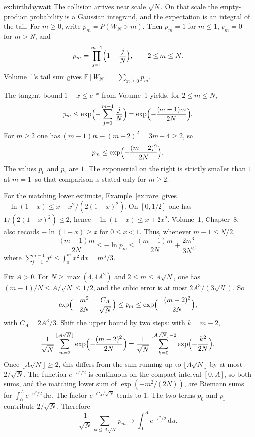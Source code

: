 \begin{solution}{ex:birthdaywait}
\idea The collision arrives near scale $\sqrt N$. On that scale the empty-product probability is a Gaussian integrand, and the expectation is an integral of the tail.
\writeup For $m\ge0$, write $p_m=P(W_N>m)$. Then $p_m=1$ for $m\le1$, $p_m=0$ for $m>N$, and
\[
 p_m=\prod_{j=1}^{m-1}\Bigl(1-\frac jN\Bigr),\qquad 2\le m\le N.
\]
Volume~1's tail sum gives $\mathbb E[W_N]=\sum_{m\ge0}p_m$.

The tangent bound $1-x\le e^{-x}$ from Volume~1 yields, for $2\le m\le N$,
\[
 p_m\le\exp\Bigl(-\sum_{j=1}^{m-1}\frac jN\Bigr)
 =\exp\Bigl(-\frac{(m-1)m}{2N}\Bigr).
\]
For $m\ge2$ one has $(m-1)m-(m-2)^2=3m-4\ge2$, so
\[
 p_m\le\exp\Bigl(-\frac{(m-2)^2}{2N}\Bigr).
\]
The values $p_0$ and $p_1$ are $1$. The exponential on the right is strictly smaller than $1$ at $m=1$, so that comparison is stated only for $m\ge2$.

For the matching lower estimate, Example~\ref{ex:rare} gives $-\ln(1-x)\le x+x^2/(2(1-x)^2)$. On $[0,1/2]$ one has $1/(2(1-x)^2)\le2$, hence $-\ln(1-x)\le x+2x^2$. Volume~1, Chapter~8, also records $-\ln(1-x)\ge x$ for $0\le x<1$. Thus, whenever $m-1\le N/2$,
\[
 \frac{(m-1)m}{2N}
 \le-\ln p_m
 \le\frac{(m-1)m}{2N}+\frac{2m^3}{3N^2},
\]
where $\sum_{j=1}^{m-1}j^2\le\int_0^m x^2\,\mathrm dx=m^3/3$.

Fix $A>0$. For $N\ge\max(4,4A^2)$ and $2\le m\le A\sqrt N$, one has $(m-1)/N\le A/\sqrt N\le1/2$, and the cubic error is at most $2A^3/(3\sqrt N)$. So
\[
 \exp\Bigl(-\frac{m^2}{2N}-\frac{C_A}{\sqrt N}\Bigr)
 \le p_m
 \le\exp\Bigl(-\frac{(m-2)^2}{2N}\Bigr),
\]
with $C_A=2A^3/3$. Shift the upper bound by two steps: with $k=m-2$,
\[
 \frac1{\sqrt N}\sum_{m=2}^{\lfloor A\sqrt N\rfloor}\exp\Bigl(-\frac{(m-2)^2}{2N}\Bigr)
 =\frac1{\sqrt N}\sum_{k=0}^{\lfloor A\sqrt N\rfloor-2}\exp\Bigl(-\frac{k^2}{2N}\Bigr).
\]
Once $\lfloor A\sqrt N\rfloor\ge2$, this differs from the sum running up to $\lfloor A\sqrt N\rfloor$ by at most $2/\sqrt N$. The function $e^{-u^2/2}$ is continuous on the compact interval $[0,A]$, so both sums, and the matching lower sum of $\exp(-m^2/(2N))$, are Riemann sums for $\int_0^A e^{-u^2/2}\,\mathrm du$. The factor $e^{-C_A/\sqrt N}$ tends to $1$. The two terms $p_0$ and $p_1$ contribute $2/\sqrt N$. Therefore
\[
 \frac1{\sqrt N}\sum_{m\le A\sqrt N}p_m\to\int_0^A e^{-u^2/2}\,\mathrm du.
\]


\end{solution}
